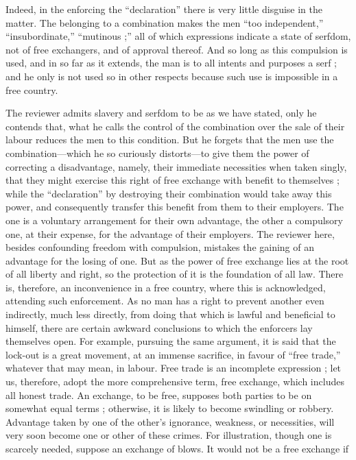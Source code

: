 Indeed, in the enforcing the ``declaration'' there is very little
disguise in the matter. The belonging to a combination makes the men
``too independent,'' ``insubordinate,'' ``mutinous ;'' all of which
expressions indicate a state of serfdom, not of free exchangers, and of
approval thereof. And so long as this compulsion is used, and in so far
as it extends, the man is to all intents and purposes a serf ; and he
only is not used so in other respects because such use is impossible in
a free country.

The reviewer admits slavery and serfdom to be as we have stated, only he
contends that, what he calls the control of the combination over the
sale of their labour reduces the men to this condition. But he forgets
that the men use the combination---which he so curiously distorts---to
give them the power of correcting a disadvantage, namely, their
immediate necessities when taken singly, that they might exercise this
right of free exchange with benefit to themselves ; while the
``declaration'' by destroying their combination would take away this
power, and consequently transfer this benefit from them to their
employers. The one is a voluntary arrangement for their own advantage,
the other a compulsory one, at their expense, for the advantage of their
employers. The reviewer here, besides confounding freedom with
compulsion, mistakes the gaining of an advantage for the losing of one.
But as the power of free exchange lies at the root of all liberty and
right, so the protection of it is the foundation of all law. There is,
therefore, an inconvenience in a free country, where this is
acknowledged, attending such enforcement. As no man has a right to
prevent another even indirectly, much less directly, from doing that
which is lawful and beneficial to himself, there are certain awkward
conclusions to which the enforcers lay themselves open. For example,
pursuing the same argument, it is said that the lock-out is a great
movement, at an immense sacrifice, in favour of ``free trade,''
whatever that may mean, in labour. Free trade is an incomplete
expression ; let us, therefore, adopt the more comprehensive term, free
exchange, which includes all honest trade. An exchange, to be free,
supposes both parties to be on somewhat equal terms ; otherwise, it is
likely to become swindling or robbery. Advantage taken by one of the
other's ignorance, weakness, or necessities, will very soon become one
or other of these crimes. For illustration, though one is scarcely
needed, suppose an exchange of blows. It would not be a free exchange if
